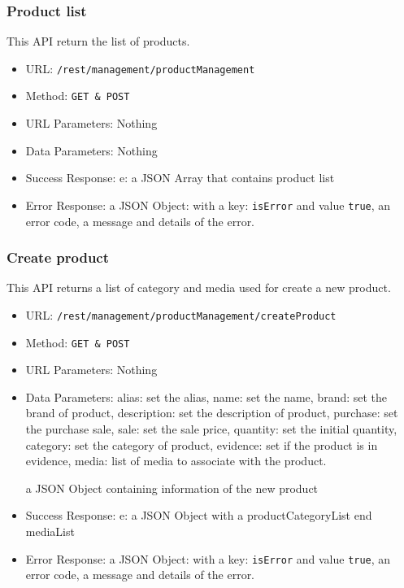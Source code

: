 \subsubsection*{Product list}
This API return the list of products.

\begin{itemize}
    \item URL: \texttt{/rest/management/productManagement}
    \item Method: \texttt{{GET \& POST}}
    \item URL Parameters: Nothing
    \item Data Parameters: Nothing
    \item Success Response: e: a JSON Array that contains product list 
    \item Error Response: a JSON Object: with a key: \texttt{isError}  and value \texttt{true}, an error code, a message and details of the error.
\end{itemize}

\subsubsection*{Create product}
This API returns a list of category and media used for create a new product.

\begin{itemize}
    \item URL: \texttt{/rest/management/productManagement/createProduct}
    \item Method: \texttt{{GET \& POST}}
    \item URL Parameters: Nothing
    \item Data Parameters: 
    alias: set the alias, name: set the name, brand: set the brand of product, description: set the description of product, purchase: set the purchase sale, sale: set the sale price, quantity: set the initial quantity, category: set the category of product, evidence: set if the product is in evidence, media: list of media to associate with the product.
    
    a JSON Object containing information of the new product
    \item Success Response: e: a JSON Object with a productCategoryList end mediaList
    \item Error Response: a JSON Object: with a key: \texttt{isError}  and value \texttt{true}, an error code, a message and details of the error.
\end{itemize}


